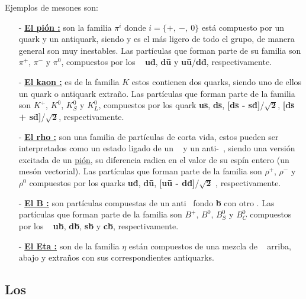 Ejemplos de mesones son:
\begin{itemize}
\item[-] \href{https://es.wikipedia.org/wiki/Pion}{\textbf{El pión :}} son la familia $\pi^i$ donde $i=\{+, ~ -,~0\}$ está compuesto por un quark y un antiquark, siendo y es el más ligero de todo el grupo, de manera general son muy inestables. Las partículas que forman parte de su familia son $\pi^+$, $\pi^-$ y $\pi^0$, compuestos por los \quarks ~ \textbf{u\={d}}, \textbf{d\={u}} y \textbf{u\={u}}/\textbf{d\={d}}, respectivamente.

\item[-] \href{https://es.wikipedia.org/wiki/Ka\%C3\%B3n}{\textbf{El kaon :}} es de la familia $K$ estos contienen dos quarks, siendo uno de ellos un quark o antiquark extraño. Las part\'iculas que forman parte de la familia son $K^+$, $K^0$, $K^0_S$ y $K^0_L$, compuestos por los quark \textbf{u\={s}}, \textbf{d\={s}}, \textbf{[d\={s} - s\={d}]}/$\mathbf{\sqrt{2}}$, \textbf{[d\={s} + s\={d}]}/$\mathbf{\sqrt{2}}$, respectivamente.

\item[-] \href{https://es.wikipedia.org/wiki/Mes\%C3\%B3n_rho}{\textbf{El rho :}} son una familia de partículas de corta vida, estos pueden ser interpretados como un estado ligado de un \quark ~ y un anti-\quark ~, siendo una versión excitada de un \href{https://es.wikipedia.org/wiki/Pion}{pión}, su diferencia radica en el valor de su espín entero (un mesón vectorial). Las part\'iculas que forman parte de la familia son $\rho^+$, $\rho^-$ y $\rho^0$ compuestos por los quarks \textbf{u\={d}}, \textbf{d\={u}}, \textbf{[u\={u} - d\={d}]}/$\mathbf{\sqrt{2}}$ , respectivamente.

\item[-] \href{https://es.wikipedia.org/wiki/Mes\%C3\%B3n_B}{\textbf{El B :}} son partículas compuestas de un anti\quark ~ fondo \textbf{\={b}} con otro \quark. Las partículas que forman parte de la familia son $B^+$, $B^0$, $B^0_S$ y $B^0_C$ compuestos por los \quarks ~ \textbf{u\={b}}, \textbf{d\={b}}, \textbf{s\={b}} y \textbf{c\={b}}, respectivamente.

\item[-] \href{https://es.wikipedia.org/wiki/Mes\%C3\%B3n_eta}{\textbf{El Eta :}}  son de la familia $\eta$ están compuestos de una mezcla de \quarks ~ arriba, abajo y extra\~nos con sus correspondientes antiquarks.
\end{itemize}

\subsection*{Los \Leptones}

